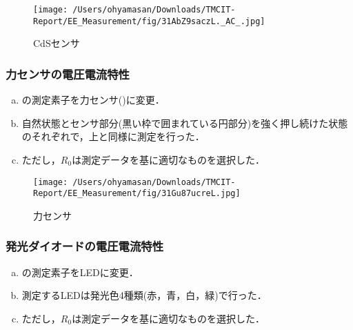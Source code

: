 \begin{figure}[h]
\centering
\texttt{[image: /Users/ohyamasan/Downloads/TMCIT-Report/EE\_Measurement/fig/31AbZ9saczL.\_AC\_.jpg]}
\caption{CdSセンサ\cite{cbs}}
\label{fig:CdS}
\end{figure}

\subsubsection{力センサの電圧電流特性}
\begin{enumerate}[a)]
	\item  {}の測定素子を力センサ()に変更．
	\item 自然状態とセンサ部分(黒い枠で囲まれている円部分)を強く押し続けた状態のそれぞれで，上と同様に測定を行った．
	\item ただし，$R_{0}$は測定データを基に適切なものを選択した．
\end{enumerate}

\begin{figure}[h]
\centering
\texttt{[image: /Users/ohyamasan/Downloads/TMCIT-Report/EE\_Measurement/fig/31Gu87ucreL.jpg]}
\caption{力センサ\cite{power}}
\label{fig:power}
\end{figure}

\subsubsection{発光ダイオードの電圧電流特性}
\begin{enumerate}[a)]
	\item {}の測定素子をLEDに変更．
	\item 測定するLEDは発光色4種類(赤，青，白，緑)で行った．
	\item ただし，$R_{0}$は測定データを基に適切なものを選択した．
\end{enumerate}